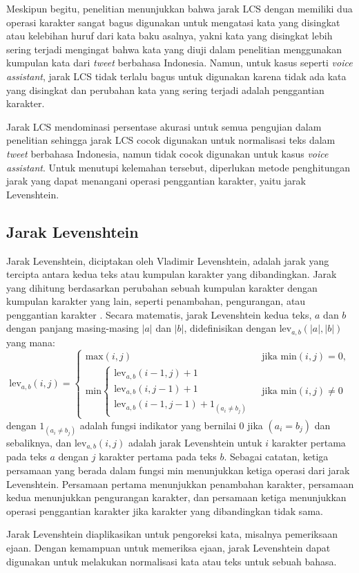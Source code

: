 Meskipun begitu, penelitian \parencite{saragih2017normalisasi} menunjukkan bahwa jarak LCS dengan memiliki dua operasi karakter sangat bagus digunakan untuk mengatasi kata yang disingkat atau kelebihan huruf dari kata baku asalnya, yakni kata yang disingkat lebih sering terjadi mengingat bahwa kata yang diuji dalam penelitian menggunakan kumpulan kata dari \textit{tweet} berbahasa Indonesia. Namun, untuk kasus seperti \textit{voice assistant}, jarak LCS tidak terlalu bagus untuk digunakan karena tidak ada kata yang disingkat dan perubahan kata yang sering terjadi adalah penggantian karakter.

Jarak LCS mendominasi persentase akurasi untuk semua pengujian dalam penelitian sehingga jarak LCS cocok digunakan untuk normalisasi teks dalam \textit{tweet} berbahasa Indonesia, namun tidak cocok digunakan untuk kasus \textit{voice assistant}. Untuk menutupi kelemahan tersebut, diperlukan metode penghitungan jarak yang dapat menangani operasi penggantian karakter, yaitu jarak Levenshtein.

\subsection{Jarak Levenshtein}

Jarak Levenshtein, diciptakan oleh Vladimir Levenshtein, adalah jarak yang tercipta antara kedua teks atau kumpulan karakter yang dibandingkan. Jarak yang dihitung berdasarkan perubahan sebuah kumpulan karakter dengan kumpulan karakter yang lain, seperti penambahan, pengurangan, atau penggantian karakter \parencite{levenshtein1966binary}. Secara matematis, jarak Levenshtein kedua teks, $a$ dan $b$ dengan panjang masing-masing $|a|$ dan $|b|$, didefinisikan dengan $\text{lev}_{a,b}(|a|,|b|)$ yang mana:
\begin{equation} \label{eq:lv}
	\text{lev}_{a,b}(i,j)=\begin{cases}
		\text{max}(i,j) & \text{ jika min} (i,j)=0, \\ 
		\text{min}\begin{cases}
			\text{lev}_{a,b}(i-1,j)+1\\ 
			\text{lev}_{a,b}(i,j-1)+1\\ 
			\text{lev}_{a,b}(i-1,j-1)+1_{(a_{i}\neq b_{j})}
		\end{cases} & \text{ jika min} (i,j)\neq 0
	\end{cases}
\end{equation}
\noindent
dengan $1_{(a_{i}\neq b_{j})}$ adalah fungsi indikator yang bernilai 0 jika $(a_{i} = b_{j})$ dan sebaliknya, dan $\text{lev}_{a,b}(i,j)$ adalah jarak Levenshtein untuk $i$ karakter pertama pada teks $a$ dengan $j$ karakter pertama pada teks $b$. Sebagai catatan, ketiga persamaan yang berada dalam fungsi min menunjukkan ketiga operasi dari jarak Levenshtein. Persamaan pertama menunjukkan penambahan karakter, persamaan kedua menunjukkan pengurangan karakter, dan persamaan ketiga menunjukkan operasi penggantian karakter jika karakter yang dibandingkan tidak sama.

Jarak Levenshtein diaplikasikan untuk pengoreksi kata, misalnya pemeriksaan ejaan. Dengan kemampuan untuk memeriksa ejaan, jarak Levenshtein dapat digunakan untuk melakukan normalisasi kata atau teks untuk sebuah bahasa.